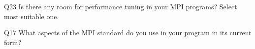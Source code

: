 \begin{description}%
\item{Q23} Is there any room for performance tuning in your MPI programs? Select most suitable one.%
\item{Q17} What aspects of the MPI standard do you use in your program in its current form?%
\end{description}%
